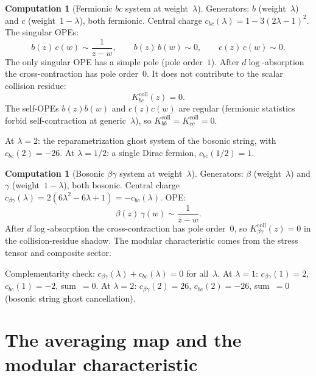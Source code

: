 \documentclass[11pt,reqno]{amsart}
\theoremstyle{definition}
\newtheorem{computation}[theorem]{Computation}
\theoremstyle{remark}
\numberwithin{equation}{section}
\begin{document}
\begin{computation}[Fermionic $bc$ system at weight~$\lambda$]
\label{comp:r-bc}
Generators: $b$ (weight~$\lambda$) and $c$
(weight~$1-\lambda$), both fermionic.
Central charge $c_{bc}(\lambda) = 1 - 3(2\lambda-1)^2$.
The singular OPEs:
\[
b(z)\,c(w) \sim \frac{1}{z-w},\qquad
b(z)\,b(w) \sim 0,\qquad
c(z)\,c(w) \sim 0.
\]
The only singular OPE has a simple pole (pole order~$1$).
After $d\log$-absorption the cross-contraction has pole order~$0$.
It does not contribute to the scalar collision residue:
\begin{equation}\label{eq:r-bc}
K_{bc}^{\mathrm{coll}}(z) = 0.
\end{equation}
The self-OPEs $b(z)b(w)$ and $c(z)c(w)$ are regular
(fermionic statistics forbid self-contraction at
generic~$\lambda$), so $K_{bb}^{\mathrm{coll}}=K_{cc}^{\mathrm{coll}}=0$.

At $\lambda = 2$: the reparametrization ghost system of the
bosonic string, with $c_{bc}(2) = -26$.
At $\lambda = 1/2$: a single Dirac fermion, $c_{bc}(1/2) = 1$.
\end{computation}

\begin{computation}[Bosonic $\beta\gamma$ system at
weight~$\lambda$]\label{comp:r-bg}
Generators: $\beta$ (weight~$\lambda$) and $\gamma$
(weight~$1-\lambda$), both bosonic.
Central charge
$c_{\beta\gamma}(\lambda) = 2(6\lambda^2 - 6\lambda + 1)
= -c_{bc}(\lambda)$.
OPE:
\[
\beta(z)\,\gamma(w) \sim \frac{1}{z-w}.
\]
After $d\log$-absorption the cross-contraction has pole order~$0$,
so $K_{\beta\gamma}^{\mathrm{coll}}(z)=0$ in the collision-residue
shadow. The modular characteristic comes from the stress tensor and
composite sector.

Complementarity check: $c_{\beta\gamma}(\lambda) +
c_{bc}(\lambda) = 0$ for all~$\lambda$.
At $\lambda = 1$: $c_{\beta\gamma}(1) = 2$,
$c_{bc}(1) = -2$, sum~$= 0$.
At $\lambda = 2$: $c_{\beta\gamma}(2) = 26$,
$c_{bc}(2) = -26$, sum~$= 0$ (bosonic string ghost
cancellation).
\end{computation}


\section{The averaging map and the modular
characteristic}\label{sec:averaging}
\end{document}
